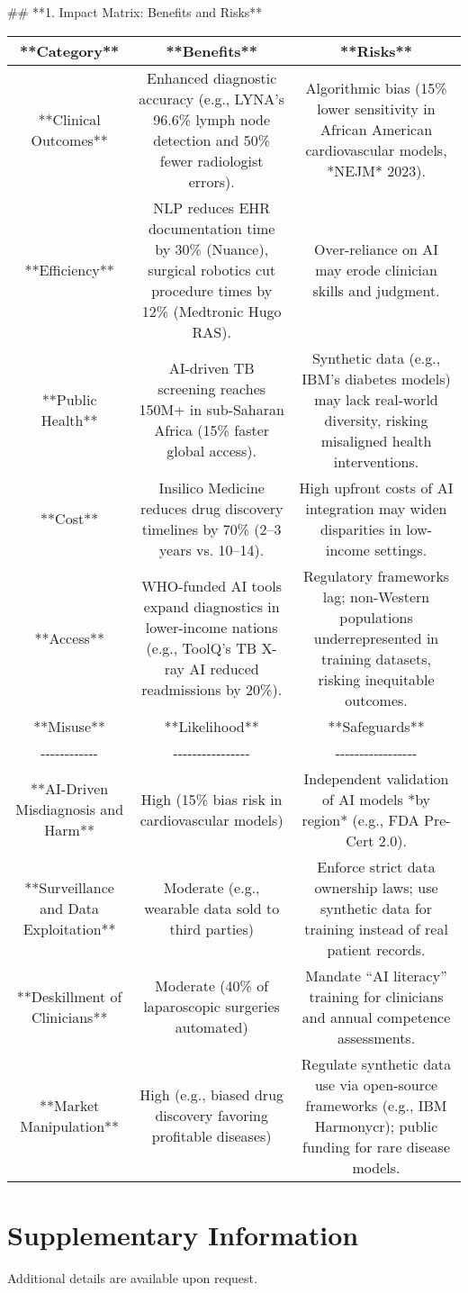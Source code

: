 \documentclass{article}%
\begin{document}
%
\#\# **1. Impact Matrix: Benefits and Risks**\newline%
%
\begin{tabular}{|ccc|}%
\hline%
**Category**&**Benefits**&**Risks**\\%
\hline%
**Clinical Outcomes**&Enhanced diagnostic accuracy (e.g., LYNA’s 96.6\% lymph node detection and 50\% fewer radiologist errors).&Algorithmic bias (15\% lower sensitivity in African American cardiovascular models, *NEJM* 2023).\\%
**Efficiency**&NLP reduces EHR documentation time by 30\% (Nuance), surgical robotics cut procedure times by 12\% (Medtronic Hugo RAS).&Over{-}reliance on AI may erode clinician skills and judgment.\\%
**Public Health**&AI{-}driven TB screening reaches 150M+ in sub{-}Saharan Africa (15\% faster global access).&Synthetic data (e.g., IBM’s diabetes models) may lack real{-}world diversity, risking misaligned health interventions.\\%
**Cost**&Insilico Medicine reduces drug discovery timelines by 70\% (2–3 years vs. 10–14).&High upfront costs of AI integration may widen disparities in low{-}income settings.\\%
**Access**&WHO{-}funded AI tools expand diagnostics in lower{-}income nations (e.g., ToolQ’s TB X{-}ray AI reduced readmissions by 20\%).&Regulatory frameworks lag; non{-}Western populations underrepresented in training datasets, risking inequitable outcomes.\\%
**Misuse**&**Likelihood**&**Safeguards**\\%
{-}{-}{-}{-}{-}{-}{-}{-}{-}{-}{-}{-}&{-}{-}{-}{-}{-}{-}{-}{-}{-}{-}{-}{-}{-}{-}{-}{-}&{-}{-}{-}{-}{-}{-}{-}{-}{-}{-}{-}{-}{-}{-}{-}{-}{-}\\%
**AI{-}Driven Misdiagnosis and Harm**&High (15\% bias risk in cardiovascular models)&Independent validation of AI models *by region* (e.g., FDA Pre{-}Cert 2.0).\\%
**Surveillance and Data Exploitation**&Moderate (e.g., wearable data sold to third parties)&Enforce strict data ownership laws; use synthetic data for training instead of real patient records.\\%
**Deskillment of Clinicians**&Moderate (40\% of laparoscopic surgeries automated)&Mandate “AI literacy” training for clinicians and annual competence assessments.\\%
**Market Manipulation**&High (e.g., biased drug discovery favoring profitable diseases)&Regulate synthetic data use via open{-}source frameworks (e.g., IBM Harmonycr); public funding for rare disease models.\\%
\hline%
\end{tabular}

%
\section{Supplementary Information}%
\label{app:supp}%
Additional details are available upon request.

%
%
%
\end{document}
